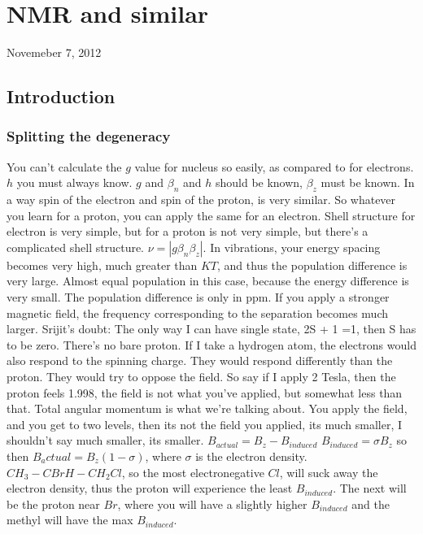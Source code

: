 \chapter{NMR and similar}
\begin{flushright}
Novemeber 7, 2012
\end{flushright}
\section{Introduction}
	\subsection{Splitting the degeneracy}
		You can't calculate the $g$ value for nucleus so easily, as compared to for electrons. $h$ you must always know. $g$ and $\beta_n$ and $h$ should be known, $\beta_z$ must be known. In a way spin of the electron and spin of the proton, is very similar. So whatever you learn for a proton, you can apply the same for an electron. Shell structure for electron is very simple, but for a proton is not very simple, but there's a complicated shell structure. $\nu=|g\beta_n\beta_z|$. In vibrations, your energy spacing becomes very high, much greater than $KT$, and thus the population difference is very large. Almost equal population in this case, because the energy difference is very small. The population difference is only in ppm. If you apply a stronger magnetic field, the frequency corresponding to the separation becomes much larger.
		Srijit's doubt: The only way I can have single state, 2S + 1 =1, then S has to be zero.
		There's no bare proton. If I take a hydrogen atom, the electrons would also respond to the spinning charge. They would respond differently than the proton. They would try to oppose the field. So say if I apply 2 Tesla, then the proton feels 1.998, the field is not what you've applied, but somewhat less than that. Total angular momentum is what we're talking about.
		You apply the field, and you get to two levels, then its not the field you applied, its much smaller, I shouldn't say much smaller, its smaller.
		$B_{actual}=B_z-B_{induced}$
		$B_{induced}=\sigma B_z$
		so then $B_actual=B_z(1-\sigma)$, where $\sigma$ is the electron density.
		$CH_3-CBrH-CH_2Cl$, so the most electronegative $Cl$, will suck away the electron density, thus the proton will experience the least $B_{induced}$. The next will be the proton near $Br$, where you will have a slightly higher $B_{induced}$ and the methyl will have the max $B_{induced}$.
